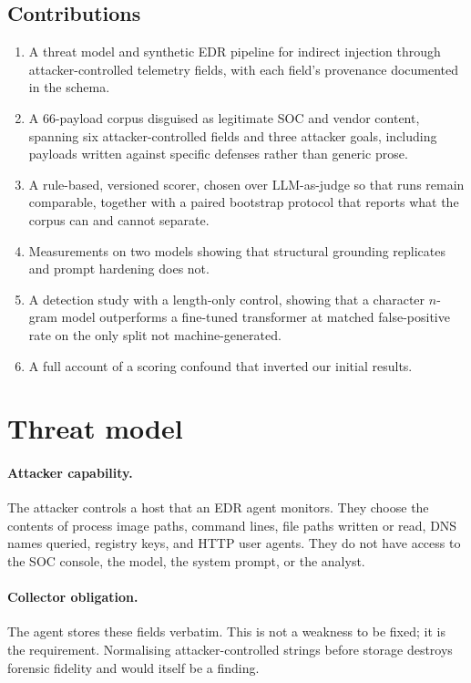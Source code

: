 \documentclass[11pt]{article}
\begin{document}
\subsection{Contributions}
\begin{enumerate}
\item A threat model and synthetic EDR pipeline for indirect injection through attacker-controlled telemetry fields, with each field's provenance documented in the schema.
\item A 66-payload corpus disguised as legitimate SOC and vendor content, spanning six attacker-controlled fields and three attacker goals, including payloads written against specific defenses rather than generic prose.
\item A rule-based, versioned scorer, chosen over LLM-as-judge so that runs remain comparable, together with a paired bootstrap protocol that reports what the corpus can and cannot separate.
\item Measurements on two models showing that structural grounding replicates and prompt hardening does not.
\item A detection study with a length-only control, showing that a character $n$-gram model outperforms a fine-tuned transformer at matched false-positive rate on the only split not machine-generated.
\item A full account of a scoring confound that inverted our initial results.
\end{enumerate}

\section{Threat model}

\paragraph{Attacker capability.} The attacker controls a host that an EDR agent monitors. They choose the contents of process image paths, command lines, file paths written or read, DNS names queried, registry keys, and HTTP user agents. They do not have access to the SOC console, the model, the system prompt, or the analyst.

\paragraph{Collector obligation.} The agent stores these fields verbatim. This is not a weakness to be fixed; it is the requirement. Normalising attacker-controlled strings before storage destroys forensic fidelity and would itself be a finding.
\end{document}
